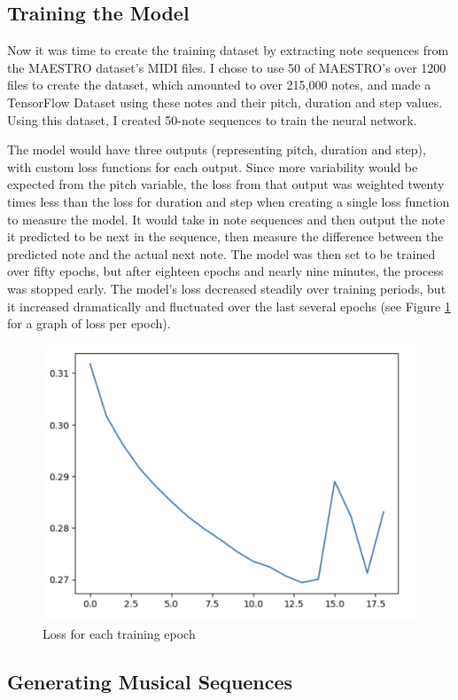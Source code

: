 \documentclass[10pt,twocolumn]{article}
\begin{document}
\subsection{Training the Model}

Now it was time to create the training dataset by extracting note sequences from the MAESTRO dataset's MIDI files. I chose to use 50 of MAESTRO's over 1200 files to create the dataset, which amounted to over 215,000 notes, and made a TensorFlow Dataset using these notes and their pitch, duration and step values. Using this dataset, I created 50-note sequences to train the neural network. 

The model would have three outputs (representing pitch, duration and step), with custom loss functions for each output. Since more variability would be expected from the pitch variable, the loss from that output was weighted twenty times less than the loss for duration and step when creating a single loss function to measure the model. It would take in note sequences and then output the note it predicted to be next in the sequence, then measure the difference between the predicted note and the actual next note. The model was then set to be trained over fifty epochs, but after eighteen epochs and nearly nine minutes, the process was stopped early. The model's loss decreased steadily over training periods, but it increased dramatically and fluctuated over the last several epochs (see Figure \ref{fig:loss} for a graph of loss per epoch).

\begin{figure}
    \centering
    \includegraphics[width=0.75\linewidth]{Loss.png}
    \caption{Loss for each training epoch}
    \label{fig:loss}
\end{figure}


\subsection{Generating Musical Sequences}
\end{document}
